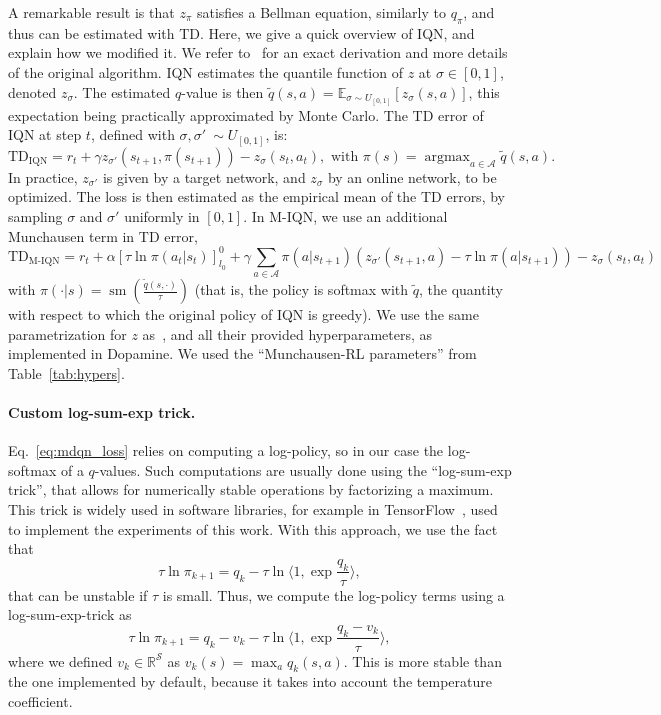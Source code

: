 \documentclass{article}
\DeclareMathOperator*{\argmax}{argmax}
\DeclareMathOperator*{\softmax}{sm}
\newcommand{\states}{\mathcal{S}}
\newcommand{\actions}{\mathcal{A}}
\begin{document}
A remarkable result is that $z_\pi$ satisfies a Bellman equation, similarly to $q_\pi$, and thus can be estimated with TD. Here, we give a quick  overview of IQN, and explain how we modified it. We refer to~\citet{dabney2018implicit} for an exact derivation and more details of the original algorithm. IQN estimates the quantile function of $z$ at $\sigma\in [0,1]$, denoted $z_\sigma$. The estimated $q$-value is then $\tilde{q}(s,a) = \mathbb{E}_{\sigma\sim U_{[0,1]}}[z_\sigma(s,a)]$, this expectation being practically approximated by Monte Carlo. The TD error of IQN at step $t$, defined with $\sigma, \sigma' ~\sim U_{[0,1]}$, is:
\begin{equation}
    \text{TD}_{\text{IQN}} = r_t + \gamma z_{\sigma'}(s_{t+1}, \pi(s_{t+1})) - z_{\sigma}(s_t,a_t), \text{ with } \pi(s) = \argmax_{a\in\actions}\tilde{q}(s,a).
\end{equation}
In practice, $z_{\sigma'}$ is given by a target network, and $z_\sigma$ by an online network, to be optimized.
The loss is then estimated as the empirical mean of the TD errors, by sampling $\sigma$ and $\sigma'$ uniformly in $[0,1]$. In M-IQN, we use an additional Munchausen term in TD error,
\begin{equation}
    \text{TD}_{\text{M-IQN}} = r_t + \alpha\left[\tau\ln\pi(a_t | s_t)\right]_{l_0}^0 + \gamma\sum_{a\in\actions} \pi(a|s_{t+1})(z_{\sigma'}(s_{t+1}, a) - \tau\ln\pi(a|s_{t+1})) - z_{\sigma}(s_t,a_t)
\end{equation}
with $\pi(\cdot|s) = \softmax(\frac{\tilde{q}(s,\cdot)}{\tau})$ (that is, the policy is softmax with $\tilde{q}$, the quantity with respect to which the original policy of IQN is greedy). We use the same parametrization for $z$ as~\citet{dabney2018implicit}, and all their provided hyperparameters, as implemented in Dopamine. We used the ``Munchausen-RL parameters'' from Table~\ref{tab:hypers}.

\paragraph{Custom log-sum-exp trick.}
Eq.~\ref{eq:mdqn_loss} relies on computing a log-policy, so in our case the log-softmax of a $q$-values. Such computations are usually done using the ``log-sum-exp trick'', that allows for numerically stable operations by factorizing a maximum. This trick is widely used in software libraries, for example in TensorFlow~\cite{tensorflow2015-whitepaper}, used to implement the experiments of this work. With this approach, we use the fact that
\begin{equation}
 \tau \ln\pi_{k+1} = q_k  - \tau \ln \langle 1, \exp \frac{q_k}{\tau} \rangle,
\end{equation}
that can be unstable if $\tau$ is small. Thus, we compute the log-policy terms using a log-sum-exp-trick as
\begin{equation}
    \tau \ln\pi_{k+1} = q_k - v_k  - \tau \ln \langle 1, \exp \frac{q_k - v_k}{\tau} \rangle,
\end{equation}
where we defined $v_k \in \mathbb{R}^\states$ as $v_k(s) = \max_a q_k(s,a)$. This is more stable than the one implemented by default, because it takes into account the temperature coefficient.
\end{document}
